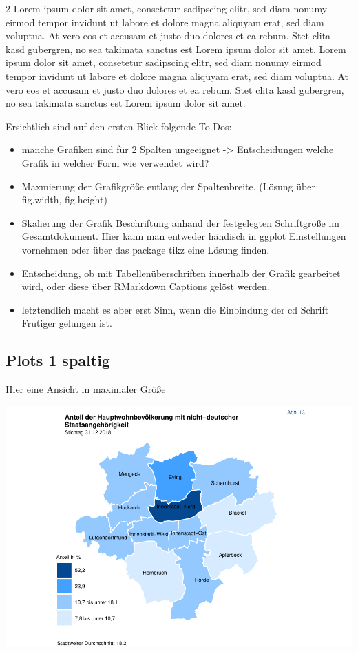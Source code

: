 \documentclass[
  a4paper,
  twoside]{article}
\providecommand{\tightlist}{%
  \setlength{\itemsep}{0pt}\setlength{\parskip}{0pt}}
\begin{document}
\begin {multicols}{2}
Lorem ipsum dolor sit amet, consetetur sadipscing elitr, sed diam nonumy eirmod tempor invidunt ut labore et dolore magna aliquyam erat, sed diam voluptua. At vero eos et accusam et justo duo dolores et ea rebum. Stet clita kasd gubergren, no sea takimata sanctus est Lorem ipsum dolor sit amet. Lorem ipsum dolor sit amet, consetetur sadipscing elitr, sed diam nonumy eirmod tempor invidunt ut labore et dolore magna aliquyam erat, sed diam voluptua. At vero eos et accusam et justo duo dolores et ea rebum. Stet clita kasd gubergren, no sea takimata sanctus est Lorem ipsum dolor sit amet.

\end {multicols}

Ersichtlich sind auf den ersten Blick folgende To Dos:

\begin{itemize}
\tightlist
\item
  manche Grafiken sind für 2 Spalten ungeeignet -\textgreater{} Entscheidungen welche Grafik in welcher Form wie verwendet wird?
\item
  Maxmierung der Grafikgröße entlang der Spaltenbreite. (Lösung über fig.width, fig.height)
\item
  Skalierung der Grafik Beschriftung anhand der festgelegten Schriftgröße im Gesamtdokument. Hier kann man entweder händisch in ggplot Einstellungen vornehmen oder über das package tikz eine Lösung finden.
\item
  Entscheidung, ob mit Tabellenüberschriften innerhalb der Grafik gearbeitet wird, oder diese über RMarkdown Captions gelöst werden.
\item
  letztendlich macht es aber erst Sinn, wenn die Einbindung der cd Schrift Frutiger gelungen ist.
\end{itemize}

\newpage

\hypertarget{plots-1-spaltig}{%
\subsection{Plots 1 spaltig}\label{plots-1-spaltig}}

Hier eine Ansicht in maximaler Größe

\includegraphics[width=1\linewidth]{2021-03-02_Beispiel_files/figure-latex/Plot map 1 spaltig-1}
\end{document}
